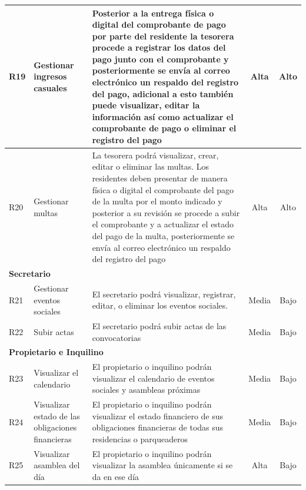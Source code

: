 \begin{spacing}{1}
\begin{center}
\begin{longtable}[l]{|p{}|p{}|p{}|p{}| p{}|}
            \hline
            R19         & Gestionar ingresos casuales                       & Posterior a la entrega física o digital del comprobante de pago por parte del residente la tesorera procede a registrar los datos del pago junto con el comprobante y posteriormente se envía al correo electrónico un respaldo del registro del pago, adicional a esto también puede visualizar, editar la información así como actualizar el comprobante de pago o eliminar el registro del pago & \multicolumn{1}{c|}{Alta} & \multicolumn{1}{c|}{Alto}\\
            \hline
            R20 & Gestionar multas & La tesorera podrá visualizar, crear, editar o eliminar las multas.
            Los residentes deben presentar de manera física o digital el comprobante del pago de la multa por el monto indicado y posterior a su revisión se procede a subir el comprobante y a actualizar el estado del pago de la multa, posteriormente se envía al correo electrónico un respaldo del registro del pago & \multicolumn{1}{c|}{Alta}  & \multicolumn{1}{c|}{Alto}\\
            \hline
            \multicolumn{5}{|l|}{ \textbf{Secretario} } \\
            \hline
            R21         & Gestionar eventos sociales                        & El secretario podrá visualizar, registrar, editar, o eliminar los eventos sociales. & \multicolumn{1}{c|}{Media} & \multicolumn{1}{c|}{Bajo}\\
            \hline
            R22         & Subir actas                           & El secretario podrá subir actas de las convocatorias & \multicolumn{1}{c|}{Media} & \multicolumn{1}{c|}{Bajo}\\
            \hline
            \multicolumn{5}{|l|}{ \textbf{Propietario e Inquilino} } \\
            \hline
            R23         & Visualizar el calendario                          & El propietario o inquilino podrán visualizar el calendario de eventos sociales y asambleas próximas & \multicolumn{1}{c|}{Media} & \multicolumn{1}{c|}{Bajo}\\
            \hline
            R24         & Visualizar estado de las obligaciones financieras & El propietario o inquilino podrán visualizar el estado financiero de sus obligaciones financieras de todas sus residencias o parqueaderos & \multicolumn{1}{c|}{Media} & \multicolumn{1}{c|}{Bajo}\\
            \hline
            R25         & Visualizar asamblea del día                       & El propietario o inquilino podrán visualizar la asamblea únicamente si se da en ese día & \multicolumn{1}{c|}{Alta} & \multicolumn{1}{c|}{Bajo}\\

\end{longtable}
\end{center}
\end{spacing}
